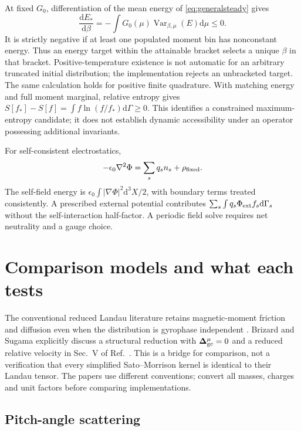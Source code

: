 \documentclass[11pt,letterpaper]{article}
\newcommand{\dd}{\mathrm d}
\begin{document}
At fixed $G_0$, differentiation of the mean energy of
\eqref{eq:generalsteady} gives
\begin{equation}
 \frac{\dd E_*}{\dd\beta}
 =-\int G_0(\mu)\operatorname{Var}_{\beta,\mu}(E)\dd\mu\le0.
 \label{eq:betamonotone}
\end{equation}
It is strictly negative if at least one populated moment bin has nonconstant
energy. Thus an energy target within the attainable bracket selects a unique
$\beta$ in that bracket. Positive-temperature existence is not automatic for
an arbitrary truncated initial distribution; the implementation rejects an
unbracketed target. The same calculation holds for positive finite quadrature.
With matching energy and full moment marginal, relative entropy gives
$S[f_*]-S[f]=\int f\ln(f/f_*)\dd\Gamma\ge0$. This identifies a constrained
maximum-entropy candidate; it does not establish dynamic accessibility under
an operator possessing additional invariants.

For self-consistent electrostatics,
\begin{equation}
 -\epsilon_0\nabla^2\Phi=\sum_s q_sn_s+\rho_{\rm fixed}.
 \label{eq:poisson}
\end{equation}
The self-field energy is $\epsilon_0\int|\nabla\Phi|^2\dd^3X/2$, with boundary
terms treated consistently. A prescribed external potential contributes
$\sum_s\int q_s\Phi_{\rm ext}f_s\dd\Gamma_s$ without the self-interaction
half-factor. A periodic field solve requires net neutrality and a gauge choice.

\section{Comparison models and what each tests}

The conventional reduced Landau literature retains magnetic-moment friction and
diffusion even when the distribution is gyrophase independent
\cite{B04,BBQ15,HBP17,BS25}. Brizard and Sugama explicitly discuss a structural
reduction with $\bm\Delta_{\rm gc}^{\mu}=0$ and a reduced relative velocity in
Sec.~V of Ref.~\cite{BS25}. This is a bridge for comparison, not a verification
that every simplified Sato--Morrison kernel is identical to their Landau tensor.
The papers use different conventions; convert all masses, charges and unit
factors before comparing implementations.

\subsection*{Pitch-angle scattering}
\end{document}
